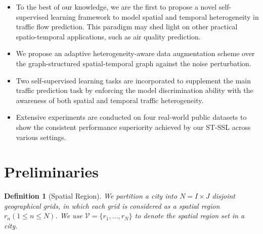 \documentclass[letterpaper]{article} \usepackage{aaai23}  \usepackage{times}  \usepackage{helvet}  \usepackage{courier}  \usepackage[hyphens]{url}  \usepackage{graphicx} \urlstyle{rm} \def\UrlFont{\rm}  \usepackage{natbib}  \usepackage{caption} \frenchspacing  \setlength{\pdfpagewidth}{8.5in} \setlength{\pdfpageheight}{11in}
\newtheorem{mydef}{Definition}
\newcommand{\name}{ST-SSL\xspace}
\begin{document}
\begin{itemize}
    \item To the best of our knowledge, we are the first to propose a novel self-supervised learning framework to model spatial and temporal heterogeneity in traffic flow prediction. This paradigm may shed light on other practical spatio-temporal applications, such as air quality prediction.
    


    \item We propose an adaptive heterogeneity-aware data augmentation scheme over the graph-structured spatial-temporal graph against the noise perturbation. 
    


    \item Two self-supervised learning tasks are incorporated to supplement the main traffic prediction task by enforcing the model discrimination ability with the awareness of both spatial and temporal traffic heterogeneity. 
    


    \item Extensive experiments are conducted on four real-world public datasets to show the consistent performance superiority achieved by our \name across various settings.
    
\end{itemize}











\section{Preliminaries}\label{sec:pre}




\begin{mydef}[Spatial Region]
We partition a city into $N = I \times J$ disjoint geographical grids, in which each grid is considered as a spatial region $r_n (1 \le n \le N)$. We use $\mathcal{V} = \{r_1, \dots, r_N\}$ to denote the spatial region set in a city. 
\end{mydef}
\end{document}
